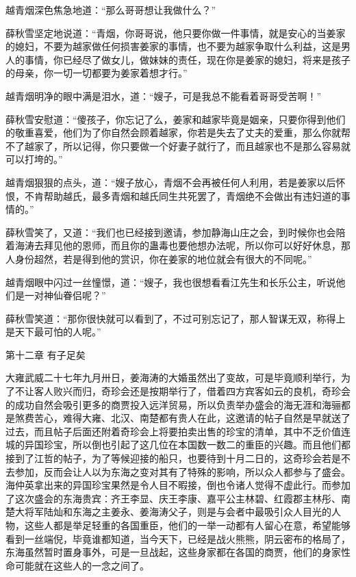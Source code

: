 越青烟深色焦急地道：“那么哥哥想让我做什么？”

薛秋雪坚定地说道：“青烟，你哥哥说，他只要你做一件事情，就是安心的当姜家的媳妇，不要为越家做任何损害姜家的事情，也不要为越家争取什么利益，这是男人的事情，你已经尽了做女儿，做妹妹的责任，现在你是姜家的媳妇，将来是孩子的母亲，你一切一切都要为姜家着想才行。”

越青烟明净的眼中满是泪水，道：“嫂子，可是我总不能看着哥哥受苦啊！”

薛秋雪安慰道：“傻孩子，你忘记了么，姜家和越家毕竟是姻亲，只要你得到他们的敬重喜爱，他们为了你自然会顾着越家，你若是失去了丈夫的爱重，那么你就帮不了越家了，所以记得，你只要做一个好妻子就行了，而且越家也不是那么容易就可以打垮的。”

越青烟狠狠的点头，道：“嫂子放心，青烟不会再被任何人利用，若是姜家以后怀恨，不肯帮助越氏，最多青烟和越氏同生共死罢了，青烟绝不会做出有违妇道的事情的。”

薛秋雪笑了，又道：“我们也已经接到邀请，参加静海山庄之会，到时候你也会陪着海涛去拜见他的恩师，而且你的蛊毒也要他想办法呢，所以你可以好好休息，那人身份超然，若是得到他的赏识，你在姜家的地位就会有很大的不同呢。”

越青烟眼中闪过一丝憧憬，道：“嫂子，我也很想看看江先生和长乐公主，听说他们是一对神仙眷侣呢？”

薛秋雪笑道：“那你很快就可以看到了，不过可别忘记了，那人智谋无双，称得上是天下最可怕的人呢。”

第十二章    有子足矣

大雍武威二十七年九月卅日，姜海涛的大婚虽然出了变故，可是毕竟顺利举行，为了不让客人败兴而归，奇珍会还是按期举行了，借着四方宾客如云的良机，奇珍会的成功自然会吸引更多的商贾投入远洋贸易，所以负责举办盛会的海无涯和海骊都是煞费苦心，难得大雍、北汉、南楚都有贵人在此，这邀请的帖子自然是早就送了过去，而且帖子后面还附着奇珍会上将要拍卖出售的珍宝的清单，其中不乏价值连城的异国珍宝，所以倒也引起了这几位在本国数一数二的重臣的兴趣。而且他们都接到了江哲的帖子，为了等候迎接的船只，也要待到十月二日的，这奇珍会若是不去参加，反而会让人以为东海之变对其有了特殊的影响，所以众人都参与了盛会。海仲英拿出来的异国珍宝果然是令人目不暇接，倒也令诸人觉得不虚此行。而参加了这次盛会的东海贵宾：齐王李显、庆王李康、嘉平公主林碧、红霞郡主林彤、南楚大将军陆灿和东海之主姜永、姜海涛父子，则是与会者中最吸引众人目光的人物，这些人都是举足轻重的各国重臣，他们的一举一动都有人留心在意，希望能够看到一丝端倪，毕竟谁都知道，当今天下，已经是战火熊熊，阴云密布的格局了，东海虽然暂时置身事外，可是一旦战起，这些身家都在各国的商贾，他们的身家性命可能就在这些人的一念之间了。

